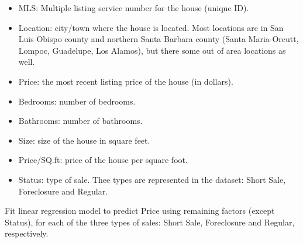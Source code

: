 \documentclass[11pt]{article}
\begin{document}
\begin{enumerate}
\begin{itemize}
\item MLS: Multiple listing service number for the house (unique ID).
\item Location: city/town where the house is located. Most locations are in San Luis Obispo county and northern Santa Barbara county (Santa Maria-Orcutt, Lompoc, Guadelupe, Los Alamos), but there some out of area locations as well.
\item Price: the most recent listing price of the house (in dollars).
\item Bedrooms: number of bedrooms.
\item Bathrooms: number of bathrooms.
\item Size: size of the house in square feet.
\item Price/SQ.ft: price of the house per square foot.
\item Status: type of sale. Thee types are represented in the dataset: Short Sale, Foreclosure and Regular.
\end{itemize}


 Fit linear regression model to predict Price using remaining factors (except Status), for each of the three types of sales: Short Sale, Foreclosure and Regular, respectively. 

\end{enumerate}


 
\end{document}
